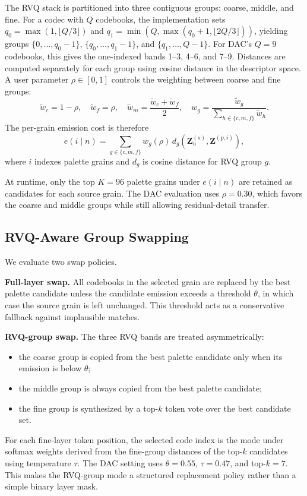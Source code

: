 \documentclass[twoside,a4paper]{article}
\begin{document}
The RVQ stack is partitioned into three contiguous groups: coarse, middle, and fine. For a codec with $Q$ codebooks, the implementation sets $q_0=\max(1,\lfloor Q/3\rfloor)$ and $q_1=\min(Q,\max(q_0+1,\lfloor 2Q/3\rfloor))$, yielding groups $\{0,\ldots,q_0-1\}$, $\{q_0,\ldots,q_1-1\}$, and $\{q_1,\ldots,Q-1\}$. For DAC's $Q=9$ codebooks, this gives the one-indexed bands 1--3, 4--6, and 7--9. Distances are computed separately for each group using cosine distance in the descriptor space. A user parameter $\rho \in [0,1]$ controls the weighting between coarse and fine groups:
\begin{equation}
\tilde{w}_c = 1-\rho,\quad \tilde{w}_f = \rho,\quad \tilde{w}_m = \frac{\tilde{w}_c+\tilde{w}_f}{2},\quad
w_g = \frac{\tilde{w}_g}{\sum_{h\in\{c,m,f\}}\tilde{w}_h}.
\end{equation}
The per-grain emission cost is therefore
\begin{equation}
e(i \mid n) = \sum_{g \in \{c,m,f\}} w_g(\rho)\, d_g\!\left(\mathbf{Z}^{(s)}_n,\mathbf{Z}^{(p,i)}\right),
\end{equation}
where $i$ indexes palette grains and $d_g$ is cosine distance for RVQ group $g$.

At runtime, only the top $K=96$ palette grains under $e(i \mid n)$ are retained as candidates for each source grain. The DAC evaluation uses $\rho=0.30$, which favors the coarse and middle groups while still allowing residual-detail transfer.

\subsection{RVQ-Aware Group Swapping}

We evaluate two swap policies.

\noindent \textbf{Full-layer swap.} All codebooks in the selected grain are replaced by the best palette candidate unless the candidate emission exceeds a threshold $\theta$, in which case the source grain is left unchanged. This threshold acts as a conservative fallback against implausible matches.

\noindent \textbf{RVQ-group swap.} The three RVQ bands are treated asymmetrically:
\begin{itemize}
    \item the coarse group is copied from the best palette candidate only when its emission is below $\theta$;
    \item the middle group is always copied from the best palette candidate;
    \item the fine group is synthesized by a top-$k$ token vote over the best candidate set.
\end{itemize}
For each fine-layer token position, the selected code index is the mode under softmax weights derived from the fine-group distances of the top-$k$ candidates using temperature $\tau$. The DAC setting uses $\theta=0.55$, $\tau=0.47$, and top-$k=7$. This makes the RVQ-group mode a structured replacement policy rather than a simple binary layer mask.
\end{document}
